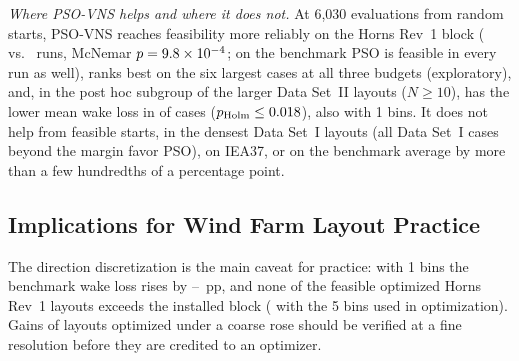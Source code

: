 \emph{Where PSO-VNS helps and where it does not.} At 6,030 evaluations from random starts, PSO-VNS reaches feasibility more reliably on the Horns Rev~1 block (\NHRFeasPSOVNS{} vs.\ \NHRFeasPSO{} runs, McNemar $p=9.8\times10^{-4}$; on the benchmark PSO is feasible in every run as well), ranks best on the six largest cases at all three budgets (exploratory), and, in the post hoc subgroup of the larger Data Set~II layouts ($N\ge10$), has the lower mean wake loss in \NCmPSOVNSvsPSOdsIILargeWins{} of \NCmPSOVNSvsPSOdsIILargeN{} cases ($p_{\rm Holm}\le0.018$), also with 1\textdegree{} bins. It does not help from feasible starts, in the densest Data Set~I layouts (all \NXHetDsINPSO{} Data Set~I cases beyond the margin favor PSO), on IEA37, or on the benchmark average by more than a few hundredths of a percentage point.

\subsection{Implications for Wind Farm Layout Practice}
\label{sec:disc-practice}
The direction discretization is the main caveat for practice: with 1\textdegree{} bins the benchmark wake loss rises by \NFLossRiseMin--\NFLossRiseMax~pp, and none of the \NFHRNFeas{} feasible optimized Horns Rev~1 layouts exceeds the installed block (\NFHRAboveFiveTotal{} with the 5\textdegree{} bins used in optimization). Gains of layouts optimized under a coarse rose should be verified at a fine resolution before they are credited to an optimizer.

